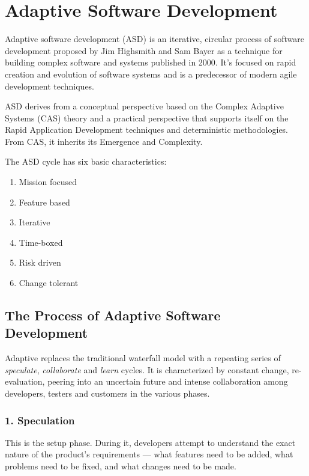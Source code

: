 \documentclass[main.tex]{subfiles}
\begin{document}
\section{Adaptive Software Development}

Adaptive software development (ASD) is an iterative, circular process of software development proposed by Jim Highsmith and Sam Bayer as a technique for building complex software and systems published in 2000.
It's focused on rapid creation and evolution of software systems and is a predecessor of modern agile development techniques.

ASD derives from a conceptual perspective based on the Complex Adaptive Systems (CAS) theory and a practical perspective that supports itself on the Rapid Application Development techniques and deterministic methodologies. From CAS, it inherits its Emergence and Complexity.

The ASD cycle has six basic characteristics:
\begin{enumerate}
	\item Mission focused
	\item Feature based
	\item Iterative
	\item Time-boxed
	\item Risk driven
	\item Change tolerant
\end{enumerate}

\subsection{The Process of Adaptive Software Development}

Adaptive replaces the traditional waterfall model with a repeating series of \emph{speculate}, \emph{collaborate} and \emph{learn} cycles.
It is characterized by constant change, re-evaluation, peering into an uncertain future and intense collaboration among developers, testers and customers in the various phases.

\subsubsection[Speculation]{1. Speculation}

This is the setup phase. During it, developers attempt to understand the exact nature of the product's requirements --- what features need to be added, what problems need to be fixed, and what changes need to be made.
\end{document}
